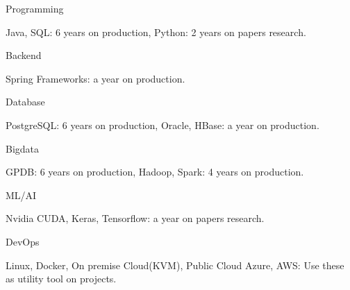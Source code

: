 

\begin{cvskills}

  \cvskill
    {Programming}
    {
      \begin{skillitems}
        \item {Java, SQL: 6 years on production, Python: 2 years on papers research.}
      \end{skillitems}
    }

  \cvskill
    {Backend}
    {
      \begin{skillitems}
        \item {Spring Frameworks: a year on production.}
      \end{skillitems}
    }

  \cvskill
    {Database}
    {
      \begin{skillitems}
        \item {PostgreSQL: 6 years on production, Oracle, HBase: a year on production.}
      \end{skillitems}
    }

  \cvskill
    {Bigdata}
    {
      \begin{skillitems}
        \item {GPDB: 6 years on production, Hadoop, Spark: 4 years on production.}
      \end{skillitems}
    }

  \cvskill
    {ML/AI}
    {
      \begin{skillitems}
        \item {Nvidia CUDA, Keras, Tensorflow: a year on papers research.}
      \end{skillitems}
    }

  \cvskill
    {DevOps} %
    {
      \begin{skillitems}
      \item {Linux, Docker, On premise Cloud(KVM), Public Cloud Azure, AWS: Use these as utility tool on projects.}
      \end{skillitems}
    }


\end{cvskills}
